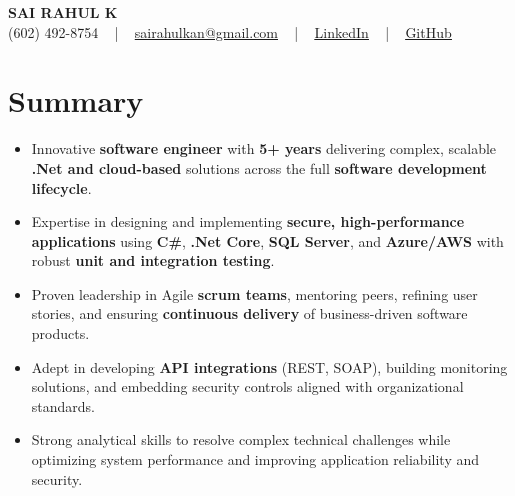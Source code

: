 \documentclass[letterpaper,11pt]{article}
\newcommand{\resumeItem}[1]{
  \item\footnotesize{
    {#1 \vspace{-2pt}}
  }
}
\newcommand{\resumeItemListStart}{\begin{itemize}[leftmargin=*]}
\newcommand{\resumeItemListEnd}{\end{itemize}\vspace{-5pt}}
\begin{document}
\begin{center}
    {\fontsize{14pt}{12pt}\selectfont \textbf{\MakeUppercase{Sai Rahul K}}}\\ \vspace{2pt}
    \fontsize{10pt}{12pt}\selectfont (602) 492-8754 ~ | ~ \href{mailto:sairahulkan@gmail.com}{sairahulkan@gmail.com} ~ | ~
    \href{https://www.linkedin.com/in/rq123/}{\color{blue}\underline{LinkedIn}} ~ | ~
    \href{https://github.com/kanrahuldo}{\color{blue}\underline{GitHub}}~
    \vspace{-8pt}
\end{center}

\section{Summary}
\fontsize{9pt}{10pt}\selectfont
\resumeItemListStart
    \resumeItem{Innovative \textbf{software engineer} with \textbf{5+ years} delivering complex, scalable \textbf{.Net and cloud-based} solutions across the full \textbf{software development lifecycle}.}
    \resumeItem{Expertise in designing and implementing \textbf{secure, high-performance applications} using \textbf{C\#}, \textbf{.Net Core}, \textbf{SQL Server}, and \textbf{Azure/AWS} with robust \textbf{unit and integration testing}.}
    \resumeItem{Proven leadership in Agile \textbf{scrum teams}, mentoring peers, refining user stories, and ensuring \textbf{continuous delivery} of business-driven software products.}
    \resumeItem{Adept in developing \textbf{API integrations} (REST, SOAP), building monitoring solutions, and embedding security controls aligned with organizational standards.}
    \resumeItem{Strong analytical skills to resolve complex technical challenges while optimizing system performance and improving application reliability and security.}
\resumeItemListEnd
\vspace{-6pt}
\end{document}
